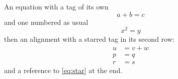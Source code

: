\documentclass{article}
\begin{document}
An equation with a tag of its own
\begin{equation}
a + b = c \tag{$\ast$}\label{eq:star}
\end{equation}
and one numbered as usual
\begin{equation}
x^2 = y
\end{equation}
then an alignment with a starred tag in its second row:
\begin{align}
u &= v + w \\
p &= q \tag*{(A)} \\
r &= s
\end{align}
and a reference to \eqref{eq:star} at the end.
\end{document}

